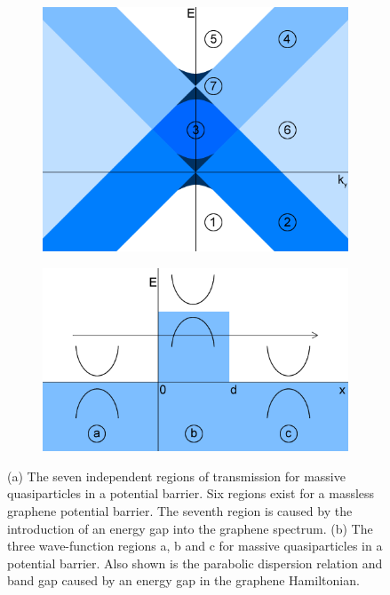 \begin{figure}
	\begin{subfigure}{0.45\textwidth}
		\centerline{\includegraphics[scale=0.4]{images/rectangular-barrier-regions-flat}}
		\caption{}
	\end{subfigure}
	\hspace{1.2cm}
	\begin{subfigure}{0.45\textwidth}
		\centerline{\includegraphics[scale=0.45]{images/potential-constant-mass-barrier-flat}}
		\caption{}
	\end{subfigure}
	\caption{(a) The seven independent regions of transmission for massive quasiparticles in a potential barrier. Six regions exist for a massless graphene potential barrier. The seventh region is caused by the introduction of an energy gap into the graphene spectrum. (b) The three wave-function regions a, b and c for massive quasiparticles in a potential barrier. Also shown is the parabolic dispersion relation and band gap caused by an energy gap in the graphene Hamiltonian.}
	\label{rectangular-barrier-regions-flat}
\end{figure}

